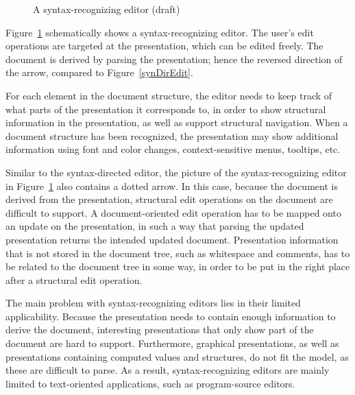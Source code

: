 \begin{figure}
\begin{small}
\begin{center}
\begin{center}
\begin{small}
\noindent
{}
\end{small}
\end{center}\caption{A syntax-recognizing editor (draft)}\label{synRecEdit} 
\end{center}
\end{small}
\end{figure}

Figure~\ref{synRecEdit} schematically shows a syntax-recognizing editor. The user's edit operations are targeted at the presentation, which can be edited freely. The document is derived by parsing the presentation; hence the reversed direction of the arrow, compared to Figure~\ref{synDirEdit}.

For each element in the document structure, the editor needs to keep track of what parts of the presentation it corresponds to, in order to show structural information in the presentation, as well as support structural navigation.  When a document structure has been recognized, the presentation may show additional information using font and color changes, context-sensitive menus, tooltips, etc.

Similar to the syntax-directed editor, the picture of the syntax-recognizing editor in Figure~\ref{synRecEdit} also contains a dotted arrow. In this case, because the document is derived from the presentation, structural edit operations on the document are difficult to support. A document-oriented edit operation has to be mapped onto an update on the presentation, in such a way that parsing the updated presentation returns the intended updated document. Presentation information that is not stored in the document tree, such as whitespace and comments, has to be related to the document tree in some way, in order to be put in the right place after a structural edit operation.

The main problem with syntax-recognizing editors lies in their limited applicability. Because the presentation needs to contain enough information to derive the document, interesting presentations that only show part of the document are hard to support. Furthermore, graphical presentations, as well as presentations containing computed values and structures, do not fit the model, as these are difficult to parse. As a result, syntax-recognizing editors are mainly limited to text-oriented applications, such as program-source editors.

